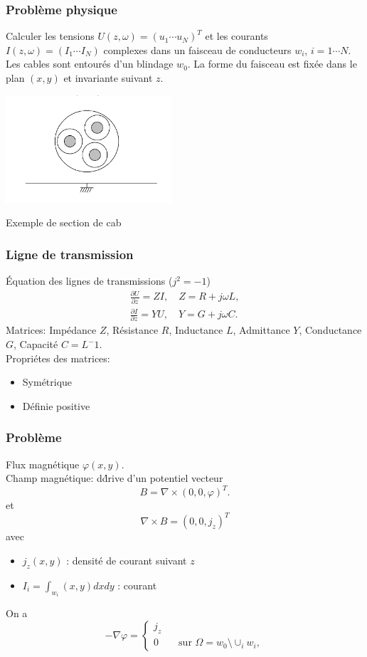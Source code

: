 \begin{frame}
\frametitle{Probl\`eme physique}
Calculer les tensions $U(z,\omega) =(u_1 \cdots u_N)^T$ et les courants $I(z,\omega) = (I_1\cdots I_N)$ complexes dans un faisceau de conducteurs $w_i$, $i=1\cdots N$. Les cables sont entour\'es d'un blindage $w_0$. La forme du faisceau est fix\'ee dans le plan $(x,y)$ et invariante suivant $z$.
\begin{center}
\includegraphics[height=4cm]{figures/f1}
\end{center}
Exemple de section de cab
\end{frame} 


\begin{frame}
\frametitle{Ligne de transmission}
\'Equation des lignes de transmissions ($j^2=-1$)
\begin{eqnarray*}
\frac{\partial U}{\partial z} =ZI, \quad Z=R+j\omega L,\\
\frac{\partial I}{\partial z} =YU, \quad Y=G+j\omega C.
\end{eqnarray*}
Matrices: 
Imp\'edance $Z$, R\'esistance $R$, Inductance $L$, Admittance $Y$, Conductance $G$, Capacit\'e
$C=L^-1.$\\[0.4cm]
Propri\'etes des matrices: 
\begin{itemize}
\item Sym\'etrique
\item D\'efinie positive
\end{itemize}

\end{frame} 

\begin{frame}
\frametitle{Probl\`eme}
Flux magn\'etique $\varphi(x,y)$. \\
Champ magn\'etique: d\'drive d'un potentiel vecteur 
$$B=\nabla \times (0,0,\varphi)^T.$$ et
$$\nabla\times B=(0,0,j_z)^T$$ avec
\begin{itemize}
\item  $j_z(x,y)$ : densit\'e de courant suivant $z$
\item  $I_i= \int _{w_i}(x,y)dxdy$ :  courant
\end{itemize}
On a
\begin{equation}
-\nabla\varphi =
\begin{cases}
j_z \\ 
0 \qquad \text{sur } \Omega =w_0 \setminus \cup_i w_i,
\end{cases}
\end{equation} 
\end{frame}

